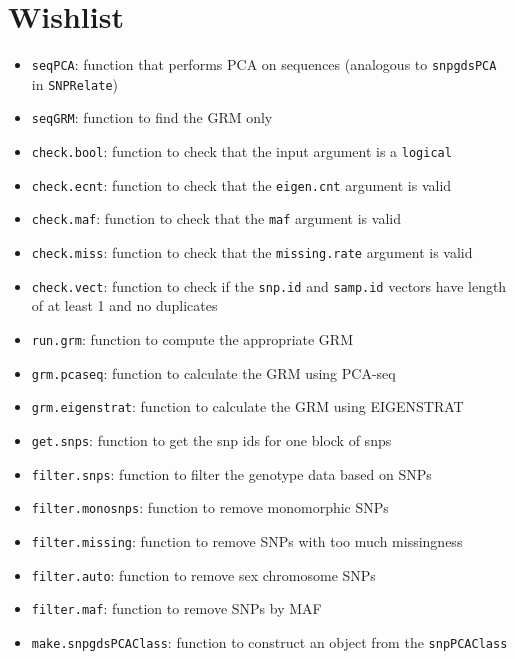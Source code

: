 \documentclass[11pt]{article}
\begin{document}
\section{Wishlist}
\begin{itemize}
	\item \texttt{seqPCA}: function that performs PCA on sequences (analogous to \texttt{snpgdsPCA} in \texttt{SNPRelate})
	\item \texttt{seqGRM}: function to find the GRM only
	\item \texttt{check.bool}: function to check that the input argument is a \texttt{logical}
	\item \texttt{check.ecnt}: function to check that the \texttt{eigen.cnt} argument is valid
	\item \texttt{check.maf}: function to check that the \texttt{maf} argument is valid
	\item \texttt{check.miss}: function to check that the \texttt{missing.rate} argument is valid
	\item \texttt{check.vect}: function to check if the \texttt{snp.id} and \texttt{samp.id} vectors have length of at least 1 and no duplicates
	\item \texttt{run.grm}: function to compute the appropriate GRM
	\item \texttt{grm.pcaseq}: function to calculate the GRM using PCA-seq
	\item \texttt{grm.eigenstrat}: function to calculate the GRM using EIGENSTRAT
	\item \texttt{get.snps}: function to get the snp ids for one block of snps
	\item \texttt{filter.snps}: function to filter the genotype data based on SNPs
	\item \texttt{filter.monosnps}: function to remove monomorphic SNPs
	\item \texttt{filter.missing}: function to remove SNPs with too much missingness
	\item \texttt{filter.auto}: function to remove sex chromosome SNPs
	\item \texttt{filter.maf}: function to remove SNPs by MAF
	\item \texttt{make.snpgdsPCAClass}: function to construct an object from the \texttt{snpPCAClass}
\end{itemize}
\end{document}
